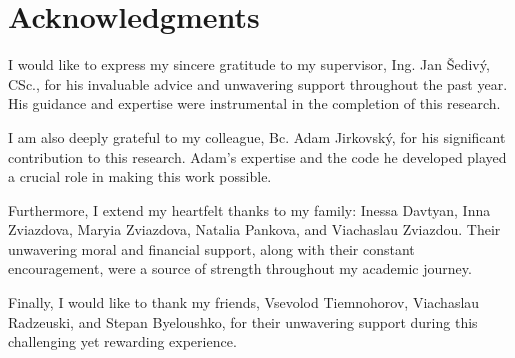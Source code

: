 
\section*{Acknowledgments}

I would like to express my sincere gratitude to my supervisor, Ing. Jan Šedivý, CSc., for his invaluable advice and unwavering support throughout the past year.
His guidance and expertise were instrumental in the completion of this research.

I am also deeply grateful to my colleague, Bc. Adam Jirkovský, for his significant contribution to this research.
Adam's expertise and the code he developed played a crucial role in making this work possible.

Furthermore, I extend my heartfelt thanks to my family: Inessa Davtyan, Inna Zviazdova, Maryia Zviazdova, Natalia Pankova, and Viachaslau Zviazdou.
Their unwavering moral and financial support, along with their constant encouragement, were a source of strength throughout my academic journey.

Finally, I would like to thank my friends, Vsevolod Tiemnohorov, Viachaslau Radzeuski, and Stepan Byeloushko, for their unwavering support during this challenging yet rewarding experience.

\vspace{2.5cm}
